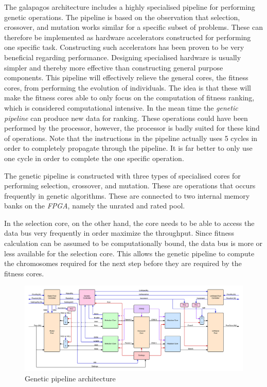 The galapagos architecture includes a highly specialised pipeline for performing genetic operations. The pipeline is based on the observation that selection, crossover, and mutation works similar for a specific subset of problems. These can therefore be implemented as hardware accelerators constructed for performing one specific task. Constructing such accelerators has been proven to be very beneficial regarding performance.  Designing specialised hardware is usually simpler and thereby more effective than constructing general purpose components. This pipeline will effectively relieve the general cores, the fitness cores, from performing the evolution of individuals. The idea is that these will make the fitness cores able to only focus on the computation of fitness ranking, which is considered computational intensive. In the mean time the \emph{genetic pipeline} can produce new data for ranking. These operations could have been performed by the processor, however, the processor is badly suited for these kind of operations. Note that the instructions in the pipeline actually uses 5 cycles in order to completely propagate through the pipeline. It is far better to only use one cycle in order to complete the one specific operation.  

The genetic pipeline is constructed with three types of specialised cores for performing selection, crossover, and mutation. These are operations that occurs frequently in genetic algorithms. These are connected to two internal memory banks on the \emph{FPGA}, namely the unrated and rated pool.

In the selection core, on the other hand, the core needs to be able to access the data bus very frequently in order maximize the throughput.
Since fitness calculation can be assumed to be computationally bound, the data bus is more or less available for the selection core.
This allows the genetic pipeline to compute the chromosomes required for the next step before they are required by the fitness cores. 


\begin{figure}

  \centering
  \includegraphics[width=\textwidth]{fpga/fig/genetic_pipeline.png}
  \caption{Genetic pipeline architecture}
  \label{fpga:fig:genetic:genetic_pipeline}
\end{figure}




